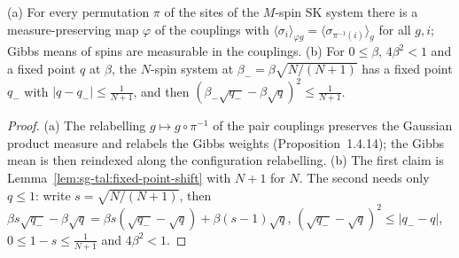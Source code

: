 \begin{lemma}
\label{lem:sg-tal:site-exchange}
  \leanok
{}
(a) For every permutation $\pi$ of the sites of the $M$-spin SK system there is a measure-preserving map $\varphi$ of the couplings with $\langle\sigma_i\rangle_{\varphi g}=\langle\sigma_{\pi^{-1}(i)}\rangle_g$ for all $g,i$; Gibbs means of spins are measurable in the couplings.
(b) For $0\le\beta$, $4\beta^2<1$ and a fixed point $q$ at $\beta$, the $N$-spin system at $\beta_-=\beta\sqrt{N/(N+1)}$ has a fixed point $q_-$ with $|q-q_-|\le\frac1{N+1}$, and then $(\beta_-\sqrt{q_-}-\beta\sqrt q)^2\le\frac1{N+1}$.
\end{lemma}
\begin{proof}
  \leanok
(a) The relabelling $g\mapsto g\circ\pi^{-1}$ of the pair couplings preserves the Gaussian product measure and relabels the Gibbs weights (Proposition~1.4.14); the Gibbs mean is then reindexed along the configuration relabelling.  (b) The first claim is Lemma~\ref{lem:sg-tal:fixed-point-shift} with $N+1$ for $N$.  The second needs only $q\le1$: write $s=\sqrt{N/(N+1)}$, then $\beta s\sqrt{q_-}-\beta\sqrt q=\beta s(\sqrt{q_-}-\sqrt q)+\beta(s-1)\sqrt q$, $(\sqrt{q_-}-\sqrt q)^2\le|q_--q|$, $0\le1-s\le\frac1{N+1}$ and $4\beta^2<1$.
\end{proof}


